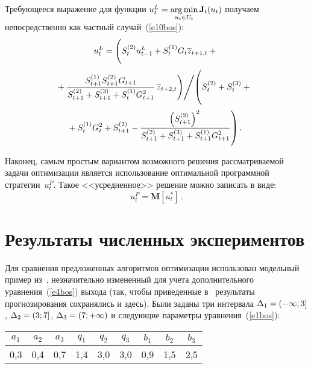 \begin{multicols}{2}
  Требующееся выражение для функции $u_t^L\hm=\argmin\limits_{u_t\in U_t}
\mathbf{J}_t(u_t)$ получаем непосредственно как частный случай~(\ref{e10bos}):
  \begin{multline}
  u_t^L= \left(\vphantom{\fr{S^{(1)}_{t+1}S^{(2)}_{t+1}G_{t+1}}{S^{(2)}_{t+1}+S^{(3)}_{t+1}+S_t^{(1)}G^2_{t+1}}}
  S_t^{(2)} u^L_{t-1}+S_t^{(1)} G_t \overline{z}_{t+1,t}+ {}\right.\\[2pt]
\hspace*{-2mm}\left.  {}+
\fr{S^{(1)}_{t+1}S^{(2)}_{t+1}G_{t+1}}{S^{(2)}_{t+1}+S^{(3)}_{t+1}+S_t^{(1)}G^2_{t+1}}\,
\overline{z}_{t+2,t}   \right)\!\Bigg/\!
    \left(
\vphantom{\fr{\left(S^{(2)}_{t+1}\right)^2}{S^{(2)}_{t+1}+S^{(3)}_{t+1}+S^{(1)}_{t+1}G^2_{t+1}}}
  S_t^{(2)}+S_t^{(3)}+{}\right.\\[2pt]
 \hspace*{-2.5mm} \left.{}+S_t^{(1)}G_t^2+S^{(2)}_{t+1}-
  \fr{\left(S^{(2)}_{t+1}\right)^2}{S^{(2)}_{t+1}+S^{(3)}_{t+1}+S^{(1)}_{t+1}G^2_{t+1}}
  \vphantom{}
  \right).\!
  \label{e11bos}
  \end{multline}
  


  Наконец, самым простым вариантом возможного решения рассматриваемой задачи 
оптимизации является использование оптимальной програм\-мной стратегии~$u_t^P$. Такое 
<<усредненное>> решение можно записать в виде:
  \begin{equation}
  u_t^P=\mathbf{M}[u_t^*]\,.
  \label{e12bos}
  \end{equation}



\section{Результаты численных экспериментов}
  
  Для сравнения предложенных алгоритмов оптимизации использован модельный пример 
из~\cite{1bos}, незначительно измененный для учета дополнительного 
уравнения~(\ref{e4bos}) выхода (так, чтобы приведенные в~\cite{1bos} результаты 
прогнозирования сохранялись и здесь). Были заданы три интервала $\Delta_1\hm=(-\infty;3]$, 
$\Delta_2\hm=(3;7]$, $\Delta_3\hm=(7;+\infty)$ и следующие параметры 
уравнения~(\ref{e1bos}):
  
\noindent
  \begin{center}
  \begin{tabular}{|c|c|c|c|c|c|c|c|c|}
  \hline
$a_1$&$a_2$&$a_3$&$q_1$&$q_2$&$q_3$&$b_1$&$b_2$&$b_3$\\
\hline
0,3&0,4&0,7&1,4&3,0&3,0&0,9&1,5&2,5\\
\hline
\end{tabular}
\end{center}


\end{multicols}

